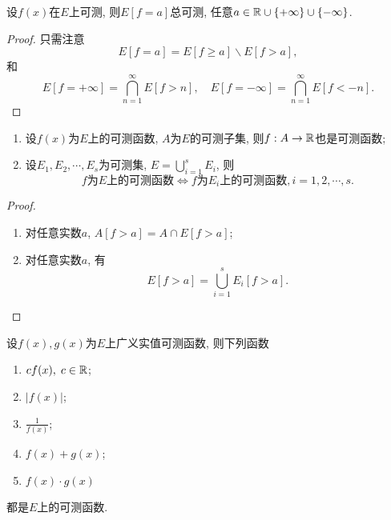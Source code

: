 \begin{corollary}
	设$f(x)$在$E$上可测, 则$E[f = a]$总可测, 
	任意$a \in \mathbb{R} \cup \{ +\infty \} \cup \{ -\infty \}$. 
\end{corollary}
\begin{proof}
	只需注意
	$$
		E[f = a] = E[f \geq a] \backslash E[f > a],
	$$
	和
	$$
		E[f = +\infty] = \bigcap\limits_{n = 1}^{\infty} E[f > n], \quad
		E[f = -\infty] = \bigcap\limits_{n = 1}^{\infty} E[f <-n].
	$$
\end{proof}

\begin{theorem}[可测函数的简单性质]
	\begin{enumerate}
		\item 设$f(x)$为$E$上的可测函数, $A$为$E$的可测子集, 则$f: A \to \mathbb{R}$也是可测函数;
		\item 设$E_1,E_2,\cdots,E_s$为可测集, $E = \bigcup_{i = 1}^s E_i$, 则
		$$
			f\text{为}E\text{上的可测函数} \Leftrightarrow f\text{为}E_i\text{上的可测函数}, i = 1,2,\cdots,s.
		$$
	\end{enumerate}
\end{theorem}

\begin{proof}
	\begin{enumerate}
		\item 对任意实数$a$, $A[f > a] = A \cap E[f > a]$;
		\item 对任意实数$a$, 有
		$$
			E[f > a] = \bigcup\limits_{i = 1}^s E_i[f > a].
		$$
	\end{enumerate}
\end{proof}

\begin{theorem}[可测函数的代数运算]
	设$f(x),g(x)$为$E$上广义实值可测函数, 则下列函数
	\begin{enumerate}
		\item $c f(x), \; c \in \mathbb{R}$; 
		\item $| f(x) |$; 
		\item $\frac{1}{f(x)}$; 
		\item $f(x) + g(x)$;
		\item $f(x) \cdot g(x)$
	\end{enumerate}
	都是$E$上的可测函数. 
\end{theorem}

